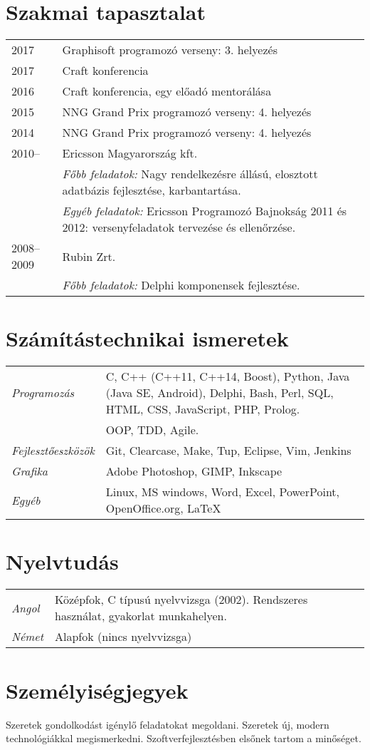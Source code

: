 \documentclass[a4paper,10pt]{article}
\newcommand{\pont}[1]{\emph{#1}}
\begin{document}
\section*{Szakmai tapasztalat}
\begin{tabular}{lp{10cm}}
 2017&Graphisoft programozó verseny: 3. helyezés\\
 2017&Craft konferencia\\
 2016&Craft konferencia, egy előadó mentorálása\\
 2015&NNG Grand Prix programozó verseny: 4. helyezés\\
 2014&NNG Grand Prix programozó verseny: 4. helyezés\\
 2010--&Ericsson Magyarország kft.\\
  &\emph{Főbb feladatok:} Nagy rendelkezésre állású, elosztott adatbázis fejlesztése, karbantartása.\\
  &\emph{Egyéb feladatok:} Ericsson Programozó Bajnokság 2011 és 2012: versenyfeladatok tervezése és ellenőrzése.\\
 2008--2009&Rubin Zrt.\\
  &\emph{Főbb feladatok:} Delphi komponensek fejlesztése.
\end{tabular}

\section*{Számítástechnikai ismeretek}
\begin{tabular}{lp{12cm}}
 \pont{Programozás}&C, C++ (C++11, C++14, Boost), Python, Java (Java SE, Android), Delphi, Bash, Perl, SQL, HTML, CSS, JavaScript, PHP, Prolog.\\
 &OOP, TDD, Agile.\\
 \pont{Fejlesztőeszközök}&Git, Clearcase, Make, Tup, Eclipse, Vim, Jenkins\\
 \pont{Grafika}&Adobe Photoshop, GIMP, Inkscape\\
 \pont{Egyéb}&Linux, MS windows, Word, Excel, PowerPoint, OpenOffice.org, LaTeX
\end{tabular}

\section*{Nyelvtudás}
\begin{tabular}{ll}
 \pont{Angol}&Középfok, C típusú nyelvvizsga (2002). Rendszeres használat, gyakorlat munkahelyen.\\
 \pont{Német}&Alapfok (nincs nyelvvizsga)
\end{tabular}

\section*{Személyiségjegyek}
Szeretek gondolkodást igénylő feladatokat megoldani. Szeretek új, modern technológiákkal megismerkedni. Szoftverfejlesztésben elsőnek tartom a minőséget.
\end{document}
